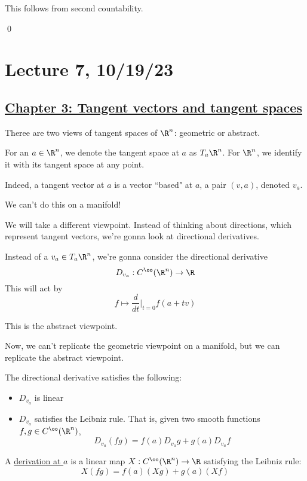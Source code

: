 \documentclass[x11names,reqno,14pt]{extarticle}
\begin{document}
\proof

This follows from second countability. 

\qed

\section*{Lecture 7, 10/19/23}

\subsection*{\underline{Chapter 3: Tangent vectors and tangent spaces}}

Theree are two views of tangent spaces of $\R^n$: geometric or abstract. 

For an $a\in\R^n$, we denote the tangent space at $a$ as $T_a\R^n$. For $\R^n$, we identify it with its tangent space at any point. 

Indeed, a tangent vector at $a$ is a vector ``based" at $a$, a pair $(v, a)$, denoted $v_a$. 

We can't do this on a manifold!

We will take a different viewpoint. Instead of thinking about directions, which represent tangent vectors, we're gonna look at directional derivatives. 

Instead of a $v_a\in T_a\R^n$, we're gonna consider the directional derivative 
\[
D_{v_a}:C^\oo(\R^n) \to \R
\]
This will act by 
\[
f \mapsto \frac{d}{dt}|_{t = 0}f(a + tv)
\]

This is the abstract viewpoint.

Now, we can't replicate the geometric viewpoint on a manifold, but we can replicate the abstract viewpoint. 

The directional derivative satisfies the following:
\begin{itemize}

\item $D_{v_a}$ is linear

\item $D_{v_a}$ satisfies the Leibniz rule. That is, given two smooth functions $f, g \in C^\oo(\R^n)$, 
\[
D_{v_a}(fg) = f(a)D_{v_a}g + g(a)D_{v_a}f
\]

\end{itemize}


A \underline{derivation at $a$} is a linear map $X:C^\oo(\R^n)\to\R$ satisfying the Leibniz rule:
\[
X(fg) = f(a)(Xg) + g(a)(Xf)
\]
\end{document}
